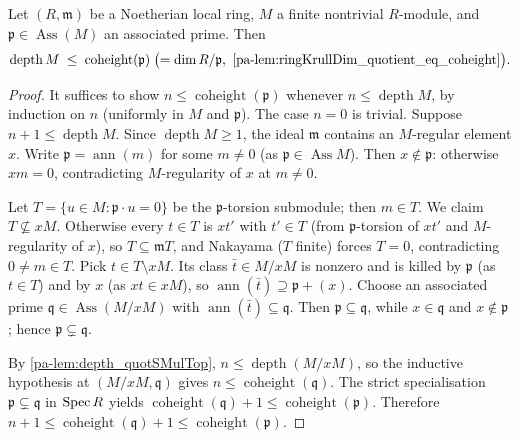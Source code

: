 \begin{theorem}
  \label{pa-thm:ischebeck}
  \leanok

  Let \((R, \mathfrak m)\) be a Noetherian local ring, \(M\) a finite nontrivial
  \(R\)-module, and \(\mathfrak p \in \operatorname{Ass}(M)\) an associated prime.
  Then
  \[
    \operatorname{depth} M \;\le\; \operatorname{coheight}(\mathfrak p)
    \;\bigl(= \dim R/\mathfrak p,\ \ref{pa-lem:ringKrullDim_quotient_eq_coheight}\bigr).
  \]
\end{theorem}
\begin{proof}
  \leanok
  It suffices to show \(n \le \operatorname{coheight}(\mathfrak p)\) whenever
  \(n \le \operatorname{depth} M\), by induction on \(n\) (uniformly in \(M\) and
  \(\mathfrak p\)). The case \(n = 0\) is trivial. Suppose
  \(n + 1 \le \operatorname{depth} M\). Since \(\operatorname{depth} M \ge 1\),
  the ideal \(\mathfrak m\) contains an \(M\)-regular element \(x\). Write
  \(\mathfrak p = \operatorname{ann}(m)\) for some \(m \neq 0\) (as
  \(\mathfrak p \in \operatorname{Ass} M\)). Then \(x \notin \mathfrak p\):
  otherwise \(x m = 0\), contradicting \(M\)-regularity of \(x\) at \(m \neq 0\).

  Let \(T = \{u \in M : \mathfrak p \cdot u = 0\}\) be the \(\mathfrak p\)-torsion
  submodule; then \(m \in T\). We claim \(T \not\subseteq xM\). Otherwise every
  \(t \in T\) is \(x t'\) with \(t' \in T\) (from \(\mathfrak p\)-torsion of
  \(x t'\) and \(M\)-regularity of \(x\)), so \(T \subseteq \mathfrak m T\), and
  Nakayama (\(T\) finite) forces \(T = 0\), contradicting \(0 \ne m \in T\). Pick
  \(t \in T \setminus xM\). Its class \(\bar t \in M/xM\) is nonzero and is killed
  by \(\mathfrak p\) (as \(t \in T\)) and by \(x\) (as \(x t \in xM\)), so
  \(\operatorname{ann}(\bar t) \supseteq \mathfrak p + (x)\). Choose an associated
  prime \(\mathfrak q \in \operatorname{Ass}(M/xM)\) with
  \(\operatorname{ann}(\bar t) \subseteq \mathfrak q\). Then
  \(\mathfrak p \subseteq \mathfrak q\), while \(x \in \mathfrak q\) and
  \(x \notin \mathfrak p\); hence \(\mathfrak p \subsetneq \mathfrak q\).

  By \ref{pa-lem:depth_quotSMulTop}, \(n \le \operatorname{depth}(M/xM)\), so the
  inductive hypothesis at \((M/xM, \mathfrak q)\) gives
  \(n \le \operatorname{coheight}(\mathfrak q)\). The strict specialisation
  \(\mathfrak p \subsetneq \mathfrak q\) in \(\operatorname{Spec} R\) yields
  \(\operatorname{coheight}(\mathfrak q) + 1 \le \operatorname{coheight}(\mathfrak p)\).
  Therefore
  \(n + 1 \le \operatorname{coheight}(\mathfrak q) + 1 \le \operatorname{coheight}(\mathfrak p)\).
\end{proof}

